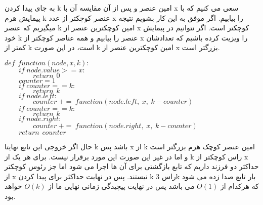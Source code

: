 به جای پیدا کردن k امین عنصر و پس از آن مقایسه آن با x سعی می کنیم که با پیمایش هرم k عنصر کوچکتر از عدد x را بیابیم.
اگر موفق به این کار بشویم نتیجه میگیریم که عنصر k امین کوچکترین عنصر از x کوچکتر است. اگر نتوانیم در پیمایش خود k عنصر را بیابیم و همه عناصر کوچکتر از x را ویزیت کرده باشیم که تعدادشان کمتر از k است، در این صورت k امین کوچکترین عنصر از x بزرگتر است.

\begin{flushleft}

$def \hspace{5pt} function (node, x, k):$\\
    $\qquad if \hspace{3pt} node.value >= x:$\\
    $\qquad \qquad return \hspace{5pt} 0$\\
    $\qquad counter = 1$\\
	$\qquad if \hspace{3pt} counter == k:$\\
	$\qquad \qquad return \hspace{5pt} k$\\
	$\qquad if \hspace{3pt} node. left:$\\
	$\qquad \qquad counter \hspace{3pt} += \hspace{3pt} function (node.left,  \hspace{3pt} x,  \hspace{3pt} k-counter)$\\
	$\qquad if \hspace{3pt} counter == k:$\\
	$\qquad \qquad return \hspace{5pt} k$\\
	$\qquad if \hspace{3pt} node. right:$\\
	$\qquad \qquad counter \hspace{3pt} += \hspace{3pt} function(node.right,  \hspace{3pt} x,  \hspace{3pt} k-counter)$\\
	$\qquad return \hspace{5pt} counter$\\

 \end{flushleft}

 حال اگر خروجی این تابع نهایتا k باشد پس x از k امین عنصر کوچک هرم بزرگتر است و اما در غیر این صورت این مورد برقرار نیست.
 برای هر یک از k راس کوچکتر از x حداکثر دو فرزند داریم که تابع بازگشتی برای آن ها اجرا می شود اما جز رئوس کوچکتر از x نیستند. پس در نهایت حداکثر برای پیدا کردن k راس 3k بار تابع صدا زده می شود که هرکدام از
 $O(1)$
 می باشد پس در نهایت پیچیدگی زمانی نهایی ما از
  $O(k)$
  خواهد بود.
